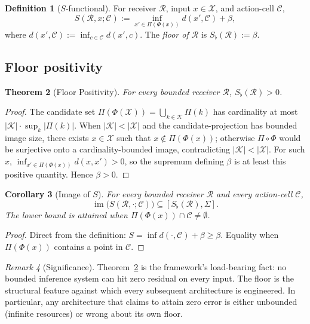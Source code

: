 \documentclass[11pt,twocolumn,a4paper]{article}
\newtheorem{theorem}{Theorem}[section]
\newtheorem{corollary}[theorem]{Corollary}
\theoremstyle{definition}
\newtheorem{definition}[theorem]{Definition}
\theoremstyle{remark}
\newtheorem{remark}[theorem]{Remark}
\DeclareMathOperator{\img}{im}
\newcommand{\Cands}{\mathcal{X}}
\newcommand{\Knowl}{\mathcal{K}}
\newcommand{\Cell}{\mathcal{C}}
\newcommand{\receiver}{\mathcal{R}}
\newcommand{\Sigmax}{\Sigma}
\newcommand{\Sscalar}{S}
\newcommand{\Sfloor}{S_{\flat}}
\begin{document}
\begin{definition}[$\Sscalar$-functional]
\label{def:S-functional}
For receiver $\receiver$, input $x \in \Cands$, and action-cell $\Cell$,
\[
\Sscalar(\receiver, x; \Cell) := \inf_{x' \in \Pi(\Phi(x))} d(x', \Cell) + \beta,
\]
where $d(x', \Cell) := \inf_{c \in \Cell} d(x', c)$. The \emph{floor of $\receiver$} is $\Sfloor(\receiver) := \beta$.
\end{definition}

\subsection{Floor positivity}

\begin{theorem}[Floor Positivity]
\label{thm:floor}
For every bounded receiver $\receiver$, $\Sfloor(\receiver) > 0$.
\end{theorem}

\begin{proof}
The candidate set $\Pi(\Phi(\Cands)) = \bigcup_{k \in \Knowl} \Pi(k)$ has cardinality at most $|\Knowl| \cdot \sup_k |\Pi(k)|$. When $|\Knowl| < |\Cands|$ and the candidate-projection has bounded image size, there exists $x \in \Cands$ such that $x \notin \Pi(\Phi(x))$; otherwise $\Pi \circ \Phi$ would be surjective onto a cardinality-bounded image, contradicting $|\Knowl| < |\Cands|$. For such $x$, $\inf_{x' \in \Pi(\Phi(x))} d(x, x') > 0$, so the supremum defining $\beta$ is at least this positive quantity. Hence $\beta > 0$.
\end{proof}

\begin{corollary}[Image of $\Sscalar$]
\label{cor:image}
For every bounded receiver $\receiver$ and every action-cell $\Cell$,
\[
\img\big(\Sscalar(\receiver, \cdot; \Cell)\big) \subseteq [\Sfloor(\receiver), \Sigmax].
\]
The lower bound is attained when $\Pi(\Phi(x)) \cap \Cell \neq \emptyset$.
\end{corollary}

\begin{proof}
Direct from the definition: $\Sscalar = \inf d(\cdot, \Cell) + \beta \geq \beta$. Equality when $\Pi(\Phi(x))$ contains a point in $\Cell$.
\end{proof}

\begin{remark}[Significance]
Theorem~\ref{thm:floor} is the framework's load-bearing fact: no bounded inference system can hit zero residual on every input. The floor is the structural feature against which every subsequent architecture is engineered. In particular, any architecture that claims to attain zero error is either unbounded (infinite resources) or wrong about its own floor.
\end{remark}
\end{document}

